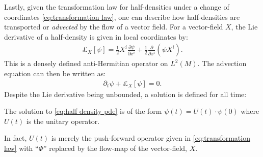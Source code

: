 \documentclass[final,leqno]{siamltex1213}
\newcommand{\pder}[2]{\ensuremath{\frac{ \partial #1}{\partial #2}}}
\begin{document}
Lastly, given the transformation law for half-densities under a change of coordinates \eqref{eq:transformation law}, one can describe how half-densities are transported or \emph{advected} by the flow of a vector field. 
For a vector-field $X$, the Lie derivative of a half-density is given in local coordinates by:
\begin{align}
	\pounds_{X}[\psi] = \frac{1}{2} X^{i} \pder{\psi}{x^{i}} + \frac{1}{2} \pder{}{x^{i}} \left( \psi X^{i} \right). \label{eq:representation}
\end{align}
This is a densely defined anti-Hermitian operator on $L^{2}(M)$.
The advection equation can then be written as:
\begin{align}
	\partial_{t} \psi + \pounds_{X}[\psi] = 0.
\end{align}
Despite the Lie derivative being unbounded, a solution is defined for all time:
\begin{proposition} \label{prop:stone}
	The solution to \eqref{eq:half density pde} is of the form $\psi(t) = U(t) \cdot \psi(0)$ where $U(t)$ is
	the unitary operator.
\end{proposition}

\noindent In fact, $U(t)$ is merely the push-forward operator given in \eqref{eq:transformation law} with ``$\Phi$'' replaced by the flow-map of the vector-field, $X$.
\end{document}
